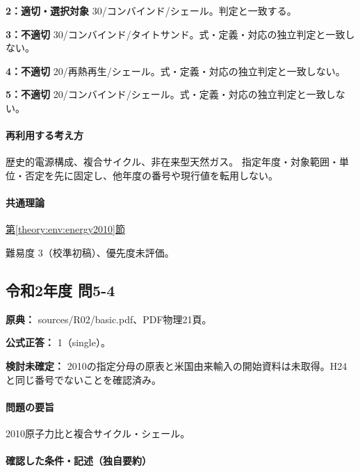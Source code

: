 \noindent\textbf{2：適切・選択対象} 30/コンバインド/シェール。判定と一致する。\par

\noindent\textbf{3：不適切} 30/コンバインド/タイトサンド。式・定義・対応の独立判定と一致しない。\par

\noindent\textbf{4：不適切} 20/再熱再生/シェール。式・定義・対応の独立判定と一致しない。\par

\noindent\textbf{5：不適切} 20/コンバインド/シェール。式・定義・対応の独立判定と一致しない。\par

\paragraph{再利用する考え方} 歴史的電源構成、複合サイクル、非在来型天然ガス。 指定年度・対象範囲・単位・否定を先に固定し、他年度の番号や現行値を転用しない。

\paragraph{共通理論} \hyperref[theory:env:energy2010]{第\ref*{theory:env:energy2010}節}

\par 難易度 3（校準初稿）、優先度未評価。

\subsection{令和2年度 問5-4}
\label{q:r02-reg-basic-5-4}

\noindent\textbf{原典：} sources/R02/basic.pdf、PDF物理21頁。

\textbf{公式正答：} 1（single）。

\par\textbf{検討未確定：} 2010の指定分母の原表と米国由来輸入の開始資料は未取得。H24と同じ番号でないことを確認済み。

\paragraph{問題の要旨} 2010原子力比と複合サイクル・シェール。

\paragraph{確認した条件・記述（独自要約）}\mbox{}\par

